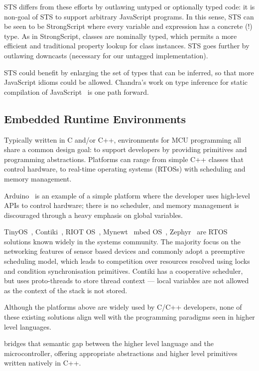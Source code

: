 STS differs from these efforts by outlawing untyped or optionally typed
code: it is non-goal of STS to support arbitrary JavaScript programs.
In this sense, STS can be seen to be StrongScript where every variable and
expression has a concrete (!) type. As in StrongScript, classes are nominally typed,
which permits a more efficient and traditional property lookup for class instances.
STS goes further by outlawing downcasts (necessary for our untagged
implementation).

STS could benefit by enlarging the set of types
that can be inferred, so that more JavaScript idioms could be allowed.
Chandra's work on type inference for static compilation of
JavaScript~\cite{ChandraOOPSLA2016} is one path forward.

\subsection{Embedded Runtime Environments}

Typically written in C and/or C++, environments for MCU programming all share a common design goal: to support developers by providing primitives and programming abstractions. Platforms can range from simple C++ classes that control hardware, to real-time operating systems (RTOSs) with scheduling and memory management.

Arduino~\cite{buildingArduino2014} is an example of a simple platform where the developer uses
high-level APIs to control hardware; there is no scheduler, and memory management
is discouraged through a heavy emphasis on global variables.

TinyOS~\cite{levis2005tinyos}, Contiki~\cite{dunkels2012contiki}, RIOT OS~\cite{baccelli2013riot}, Mynewt~\cite{ApacheMy53:online} mbed OS~\cite{ARMmbed}, Zephyr~\cite{HomeZeph63:online} are RTOS solutions known widely in the systems community. The majority focus on the networking features of sensor based devices and commonly adopt a preemptive scheduling model, which leads to competition over resources resolved using locks and condition synchronisation primitives. Contiki has a cooperative scheduler, but uses proto-threads to store thread context --- local variables are not allowed as the context of the stack is not stored.

Although the platforms above are widely used by C/C++ developers, none of these existing solutions align well with the programming paradigms seen in higher level languages.

\CO bridges that semantic gap between the higher level language and the microcontroller, offering appropriate abstractions and higher level primitives written natively in C++.

